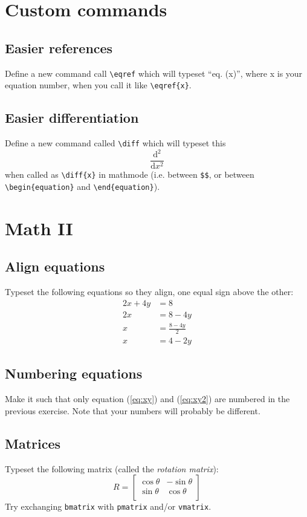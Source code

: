 \documentclass[a4paper, 12pt]{article}
\newcommand{\diff}[2]{\frac{\mathrm{d}#1}{\mathrm{d}#2}}
\begin{document}
\section{Custom commands}
\subsection{Easier references}
Define a new command call \verb!\eqref! which will typeset ``eq. (x)'', where x is your equation number, when you call it like \verb!\eqref{x}!.

\subsection{Easier differentiation}
Define a new command called \verb!\diff! which will typeset this 
\begin{equation}
	\frac{\mathrm{d}^2}{\mathrm{d} x^2}
\end{equation}
when called as \verb!\diff{x}! in mathmode (i.e. between \verb!$$!, or between \verb!\begin{equation}! and \verb!\end{equation}!).



\section{Math II}
\subsection{Align equations}
Typeset the following equations so they align, one equal sign above the other:
\begin{align}
	2x+4y &= 8 \label{eq:xy} \\
	2x &= 8-4y \\
	x &= \frac{8-4y}{2} \\
	x &= 4-2y \label{eq:xy2}
\end{align}

\subsection{Numbering equations}
Make it such that only equation (\ref{eq:xy}) and (\ref{eq:xy2}) are numbered in the previous exercise. Note that your numbers will probably be different.

\subsection{Matrices}
Typeset the following matrix (called the \emph{rotation matrix}):
\begin{equation*}
R =
\begin{bmatrix}
\cos \theta & -\sin \theta \\
\sin \theta & \cos \theta \\
\end{bmatrix}
\end{equation*}
Try exchanging \verb!bmatrix! with \verb!pmatrix! and/or \verb!vmatrix!.
\end{document}
